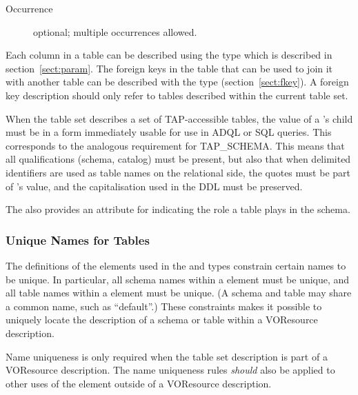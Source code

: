 \documentclass[11pt,a4paper]{ivoa}
\newcommand{\tapschema}{TAP\_SCHE\-MA}
\newcommand{\tapschema}{\mbox{%
  TAP\discretionary{-}{}{\kern-2pt\_}SCHEMA}}
\begin{document}
\begin{generated}
\begin{bigdescription}
\begin{description}
\item[Occurrence] optional; multiple occurrences allowed.

\end{description}


\end{bigdescription}\endgroup

\endgroup
\end{generated}





Each column in a table can be described using the
 type which is described in
section~\ref{sect:param}.  The foreign keys in the table that
can be used to join it with another table can be described with the
 type (section~\ref{sect:fkey}).
A foreign key description should only refer to tables described within
the current table set.  

When the table set describes a set of TAP-accessible tables, the value of
a 's  child must be in a form immediately
usable for use in ADQL or SQL queries. This corresponds to the analogous
requirement for \tapschema.  This means that all qualifications (schema,
catalog) must be present, but also that when delimited
identifiers are used as table names on the relational side,
the quotes must be part of 's value, and the
capitalisation used in the DDL must be preserved.


The  also provides an attribute for indicating
the role a table plays in the schema.





\subsubsection{Unique Names for Tables}
\label{sect:unique}


The definitions of the  elements used in
the  and
 types
constrain certain names to be unique.  In particular, all schema names
within a  element must be unique, and all
table names within a  element must be
unique.  (A schema and table may share a common name, such as
``default''.)  These constraints makes it possible to uniquely locate
the description of a schema or table within a VOResource description.  

Name uniqueness is only required when the table set description is
part of a VOResource description.  The name uniqueness rules
\emph{should} also be applied to other uses of the
 element outside of a VOResource
description.  
\end{document}
